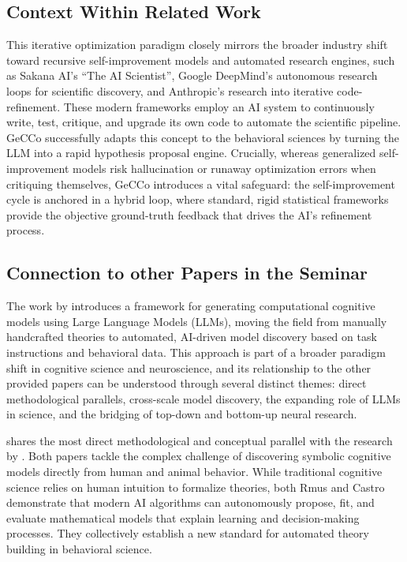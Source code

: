 \subsection*{Context Within Related Work}
This iterative optimization paradigm closely mirrors the broader industry shift toward recursive self-improvement models and automated research engines, such as Sakana AI's ``The AI Scientist'', Google DeepMind's autonomous research loops for scientific discovery, and Anthropic's research into iterative code-refinement. These modern frameworks employ an AI system to continuously write, test, critique, and upgrade its own code to automate the scientific pipeline. GeCCo successfully adapts this concept to the behavioral sciences by turning the LLM into a rapid hypothesis proposal engine. Crucially, whereas generalized self-improvement models risk hallucination or runaway optimization errors when critiquing themselves, GeCCo introduces a vital safeguard: the self-improvement cycle is anchored in a hybrid loop, where standard, rigid statistical frameworks provide the objective ground-truth feedback that drives the AI's refinement process.

\subsection{Connection to other Papers in the Seminar}
The work by \citet{rmus2025generating} introduces a framework for generating computational cognitive models using Large Language Models (LLMs), moving the field from manually handcrafted theories to automated, AI-driven model discovery based on task instructions and behavioral data. This approach is part of a broader paradigm shift in cognitive science and neuroscience, and its relationship to the other provided papers can be understood through several distinct themes: direct methodological parallels, cross-scale model discovery, the expanding role of LLMs in science, and the bridging of top-down and bottom-up neural research.

\citet{rmus2025generating} shares the most direct methodological and conceptual parallel with the research by \citet{castro2025discovering}. Both papers tackle the complex challenge of discovering symbolic cognitive models directly from human and animal behavior. While traditional cognitive science relies on human intuition to formalize theories, both Rmus and Castro demonstrate that modern AI algorithms can autonomously propose, fit, and evaluate mathematical models that explain learning and decision-making processes. They collectively establish a new standard for automated theory building in behavioral science.

